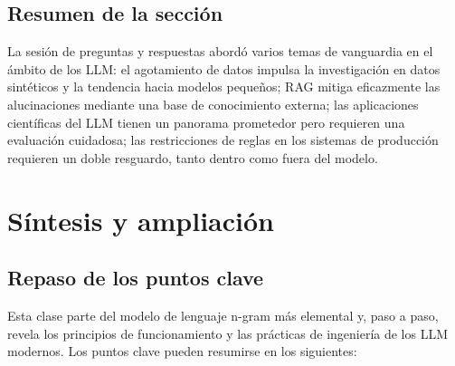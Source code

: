 \documentclass[a4paper]{article}
\begin{document}
\subsection{Resumen de la sección}

La sesión de preguntas y respuestas abordó varios temas de vanguardia en el ámbito de los LLM: el agotamiento de datos impulsa la investigación en datos sintéticos y la tendencia hacia modelos pequeños; RAG mitiga eficazmente las alucinaciones mediante una base de conocimiento externa; las aplicaciones científicas del LLM tienen un panorama prometedor pero requieren una evaluación cuidadosa; las restricciones de reglas en los sistemas de producción requieren un doble resguardo, tanto dentro como fuera del modelo.
\section{Síntesis y ampliación}

\subsection{Repaso de los puntos clave}

Esta clase parte del modelo de lenguaje n-gram más elemental y, paso a paso, revela los principios de funcionamiento y las prácticas de ingeniería de los LLM modernos. Los puntos clave pueden resumirse en los siguientes:
\end{document}
